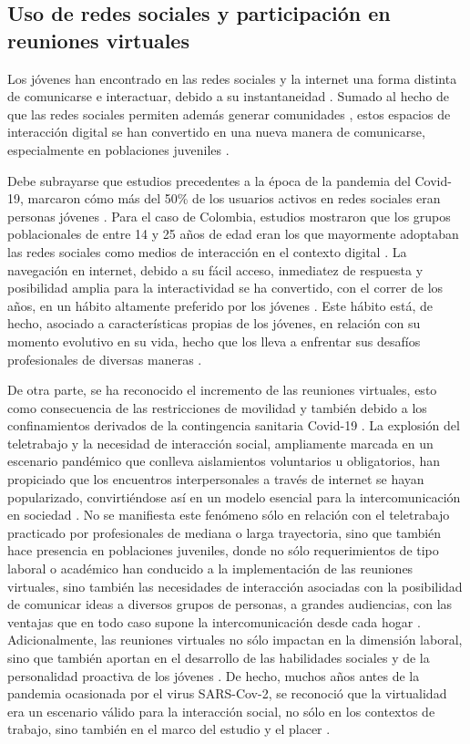 \documentclass[spanish]{textolivre}
\begin{document}
\subsection{Uso de redes sociales y participación en reuniones virtuales}
 
Los jóvenes han encontrado en las redes sociales y la internet una forma distinta de comunicarse e interactuar, debido a su instantaneidad \cite{schwarz2011}. Sumado al hecho de que las redes sociales permiten además generar comunidades \cite{arcilacalderon2017}, estos espacios de interacción digital se han convertido en una nueva manera de comunicarse, especialmente en poblaciones juveniles \cite{almansa-martinez2013, arcilacalderon2017}.

Debe subrayarse que estudios precedentes a la época de la pandemia del Covid-19, marcaron cómo más del 50\% de los usuarios activos en redes sociales eran personas jóvenes \cite{mander2016}. Para el caso de Colombia, estudios mostraron que los grupos poblacionales de entre 14 y 25 años de edad eran los que mayormente adoptaban las redes sociales como medios de interacción en el contexto digital \cite{arcilacalderon2017}. La navegación en internet, debido a su fácil acceso, inmediatez de respuesta y posibilidad amplia para la interactividad \cite{echeburua2010} se ha convertido, con el correr de los años, en un hábito altamente preferido por los jóvenes \cite{puerta-cortes2014}. Este hábito está, de hecho, asociado a características propias de los jóvenes, en relación con su momento evolutivo en su vida, hecho que los lleva a enfrentar sus desafíos profesionales de diversas maneras \cite{young2004}. 

De otra parte, se ha reconocido el incremento de las reuniones virtuales, esto como consecuencia de las restricciones de movilidad y también debido a los confinamientos derivados de la contingencia sanitaria Covid-19 \cite{antonello2020}. La explosión del teletrabajo y la necesidad de interacción social, ampliamente marcada en un escenario pandémico que conlleva aislamientos voluntarios u obligatorios, han propiciado que los encuentros interpersonales a través de internet se hayan popularizado, convirtiéndose así en un modelo esencial para la intercomunicación en sociedad \cite{karl2021}. No se manifiesta este fenómeno sólo en relación con el teletrabajo practicado por profesionales de mediana o larga trayectoria, sino que también hace presencia en poblaciones juveniles, donde no sólo requerimientos de tipo laboral o académico han conducido a la implementación de las reuniones virtuales, sino también las necesidades de interacción asociadas con la posibilidad de comunicar ideas a diversos grupos de personas, a grandes audiencias, con las ventajas que en todo caso supone la intercomunicación desde cada hogar \cite{danna2020}. Adicionalmente, las reuniones virtuales no sólo impactan en la dimensión laboral, sino que también aportan en el desarrollo de las habilidades sociales y de la personalidad proactiva de los jóvenes \cite{notley2009}. De hecho, muchos años antes de la pandemia ocasionada por el virus SARS-Cov-2, se reconoció que la virtualidad era un escenario válido para la interacción social, no sólo en los contextos de trabajo, sino también en el marco del estudio y el placer \cite{tomek1999}.
\end{document}
